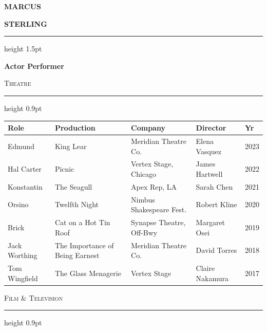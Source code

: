 \documentclass[11pt,letterpaper]{article}
\newcommand{\ressection}[1]{%
  \vspace{0.9em}%
  {\large\scshape\color{primary}#1}%
  \vspace{1pt}%
  \par{\color{accent}\hrule height 0.9pt}%
  \vspace{0.45em}%
}
\begin{document}
\begin{minipage}[t]{0.67\textwidth}
  \vspace{0.5em}
  {\fontsize{28}{34}\selectfont\bfseries\color{primary}MARCUS}\par
  {\fontsize{28}{34}\selectfont\bfseries\color{primary}STERLING}\par
  \vspace{4pt}
  {\color{accent}\hrule height 1.5pt}
  \vspace{6pt}
  {\bfseries\color{primary}Actor {\textbar} Performer}\par
  \vspace{10pt}

  \ressection{Theatre}

  {\footnotesize
  \begin{tabularx}{\linewidth}{@{}P{2.5cm} Z P{2.5cm} P{1.9cm} P{1.0cm}@{}}
    \toprule
    \textbf{Role} & \textbf{Production} & \textbf{Company} & \textbf{Director} & \textbf{Yr} \\
    \midrule
    Edmund & King Lear & Meridian Theatre Co. & Elena Vasquez & 2023 \\
    Hal Carter & Picnic & Vertex Stage, Chicago & James Hartwell & 2022 \\
    Konstantin & The Seagull & Apex Rep, LA & Sarah Chen & 2021 \\
    Orsino & Twelfth Night & Nimbus Shakespeare Fest. & Robert Kline & 2020 \\
    Brick & Cat on a Hot Tin Roof & Synapse Theatre, Off-Bwy & Margaret Osei & 2019 \\
    Jack Worthing & The Importance of Being Earnest & Meridian Theatre Co. & David Torres & 2018 \\
    Tom Wingfield & The Glass Menagerie & Vertex Stage & Claire Nakamura & 2017 \\
    \bottomrule
  \end{tabularx}}

  \ressection{Film \& Television}


\end{minipage}
\end{document}
